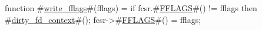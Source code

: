 function #\hyperref[sailRISCVzwritezyfflags]{write\_fflags}#(fflags) = {
  if   fcsr.#\hyperref[sailRISCVzFFLAGS]{FFLAGS}#() != fflags
  then #\hyperref[sailRISCVzdirtyzyfdzycontext]{dirty\_fd\_context}#();
  fcsr->#\hyperref[sailRISCVzFFLAGS]{FFLAGS}#() = fflags;
}
